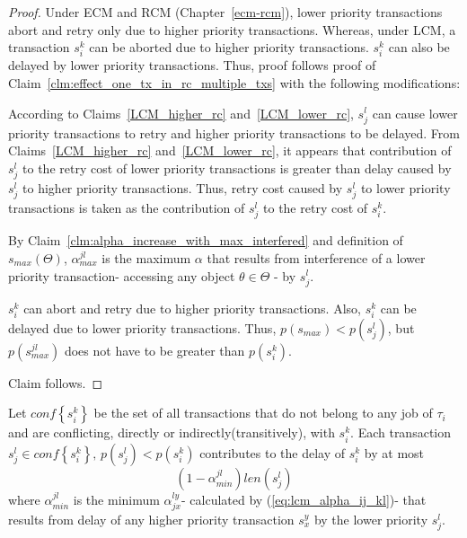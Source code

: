 \begin{proof}
Under ECM and RCM (Chapter~\ref{ecm-rcm}), lower priority transactions abort and retry only due to higher priority transactions. Whereas, under LCM, a transaction $s_i^k$ can be aborted due to higher priority transactions. $s_i^k$ can also be delayed by lower priority transactions. Thus, proof follows proof of Claim~\ref{clm:effect_one_tx_in_rc_multiple_txs} with the following modifications:
\begin{compactitem}
\item According to Claims~\ref{LCM_higher_rc} and~\ref{LCM_lower_rc}, $s_j^l$ can cause lower priority transactions to retry and higher priority transactions to be delayed. From Claims~\ref{LCM_higher_rc} and~\ref{LCM_lower_rc}, it appears that contribution of $s_j^l$ to the retry cost of lower priority transactions is greater than delay caused by $s_j^l$ to higher priority transactions. Thus, retry cost caused by $s_j^l$ to lower priority transactions is taken as the contribution of $s_j^l$ to the retry cost of $s_i^k$.
\item By Claim~\ref{clm:alpha_increase_with_max_interfered} and definition of $s_{max}\left(\Theta\right)$, $\alpha_{max}^{jl}$ is the maximum $\alpha$ that results from interference of a lower priority transaction- accessing any object $\theta \in \Theta$ - by $s_j^l$.
\item $s_i^k$ can abort and retry due to higher priority transactions. Also, $s_i^k$ can be delayed due to lower priority transactions. Thus, $p\left(s_{max}\right)<p\left(s_j^l\right)$, but $p\left(s_{max}^{jl}\right)$ does not have to be greater than $p\left(s_i^k\right)$.
\end{compactitem}
Claim follows.
%
\end{proof}
%
\begin{clm}\label{clm:lcm_effect_one_tx_in_rc_multiple_txs_lower_priority}
%
Let $conf\left\{ s_{i}^{k}\right\} $ be the set of all transactions
that do not belong to any job of $\tau_{i}$ and are conflicting, directly or indirectly(transitively), with
$s_{i}^{k}$. Each transaction $s_{j}^{l}\in conf\left\{ s_{i}^{k}\right\},\,p\left(s_j^l\right)<p\left(s_i^k\right) $
contributes to the delay of $s_{i}^{k}$ by at most 
\begin{equation}
\left(1-\alpha_{min}^{jl}\right)len\left(s_j^l\right)
\label{eq:lcm_effect_one_tx_in_rc_multiple_txs_lower_priority}
\end{equation}
where $\alpha_{min}^{jl}$ is the minimum $\alpha_{jx}^{ly}$- calculated by (\ref{eq:lcm_alpha_ij_kl})- that results from delay of any higher priority transaction $s_x^y$ by the lower priority $s_j^l$.
%
\end{clm}

